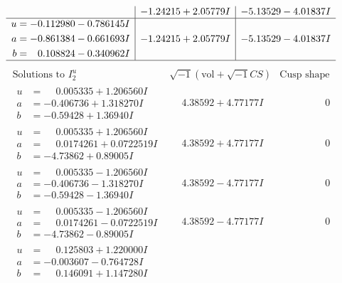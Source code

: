 \documentclass[1p]{elsarticle_modified}
\theoremstyle{definition}
\newcommand{\I}{\sqrt{-1}}
\begin{document}
$$\begin{array}{c|c|c}
 & -1.24215 + 2.05779 I & -5.13529 - 4.01837 I \\ \hline\begin{aligned}
u &= -0.112980 - 0.786145 I \\
a &= -0.861384 - 0.661693 I \\
b &= \phantom{-}0.108824 - 0.340962 I\end{aligned}
 & -1.24215 + 2.05779 I & -5.13529 - 4.01837 I\\
 \hline 
 \end{array}$$\newpage$$\begin{array}{c|c|c}  
\text{Solutions to }I^u_{2}& \I (\text{vol} + \sqrt{-1}CS) & \text{Cusp shape}\\
 \hline 
\begin{aligned}
u &= \phantom{-}0.005335 + 1.206560 I \\
a &= -0.406736 + 1.318270 I \\
b &= -0.59428 + 1.36940 I\end{aligned}
 & \phantom{-}4.38592 + 4.77177 I & \phantom{-0.000000 } 0 \\ \hline\begin{aligned}
u &= \phantom{-}0.005335 + 1.206560 I \\
a &= \phantom{-}0.0174261 + 0.0722519 I \\
b &= -4.73862 + 0.89005 I\end{aligned}
 & \phantom{-}4.38592 + 4.77177 I & \phantom{-0.000000 } 0 \\ \hline\begin{aligned}
u &= \phantom{-}0.005335 - 1.206560 I \\
a &= -0.406736 - 1.318270 I \\
b &= -0.59428 - 1.36940 I\end{aligned}
 & \phantom{-}4.38592 - 4.77177 I & \phantom{-0.000000 } 0 \\ \hline\begin{aligned}
u &= \phantom{-}0.005335 - 1.206560 I \\
a &= \phantom{-}0.0174261 - 0.0722519 I \\
b &= -4.73862 - 0.89005 I\end{aligned}
 & \phantom{-}4.38592 - 4.77177 I & \phantom{-0.000000 } 0 \\ \hline\begin{aligned}
u &= \phantom{-}0.125803 + 1.220000 I \\
a &= -0.003607 - 0.764728 I \\
b &= \phantom{-}0.146091 + 1.147280 I\end{aligned}

\end{array}$$
\end{document}
